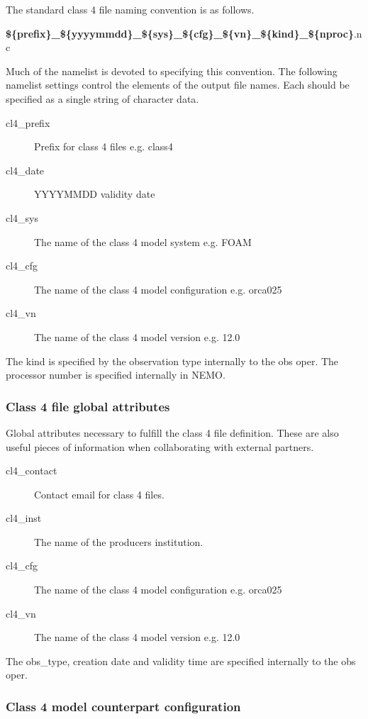\documentclass[../tex_main/NEMO_manual]{subfiles}
\begin{document}
The standard class 4 file naming convention is as follows.

\noindent
\linebreak
\textbf{\$\{prefix\}\_\$\{yyyymmdd\}\_\$\{sys\}\_\$\{cfg\}\_\$\{vn\}\_\$\{kind\}\_\$\{nproc\}}.nc

\noindent
\linebreak
Much of the namelist is devoted to specifying this convention. The
following namelist settings control the elements of the output
file names. Each should be specified as a single string of character data.

\begin{description}
\item[cl4\_prefix]
Prefix for class 4 files e.g. class4
\item[cl4\_date]
YYYYMMDD validity date
\item[cl4\_sys]
The name of the class 4 model system e.g. FOAM
\item[cl4\_cfg]
The name of the class 4 model configuration e.g. orca025
\item[cl4\_vn]
The name of the class 4 model version e.g. 12.0
\end{description}

\noindent
The kind is specified by the observation type internally to the obs oper. The processor
number is specified internally in NEMO. 

\subsubsection{Class 4 file global attributes}

Global attributes necessary to fulfill the class 4 file definition. These
are also useful pieces of information when collaborating with external
partners.

\begin{description}
\item[cl4\_contact]
Contact email for class 4 files.
\item[cl4\_inst]
The name of the producers institution.
\item[cl4\_cfg]
The name of the class 4 model configuration e.g. orca025
\item[cl4\_vn]
The name of the class 4 model version e.g. 12.0
\end{description}

\noindent
The obs\_type,
creation date and validity time are specified internally to the obs oper.

\subsubsection{Class 4 model counterpart configuration}
\end{document}
